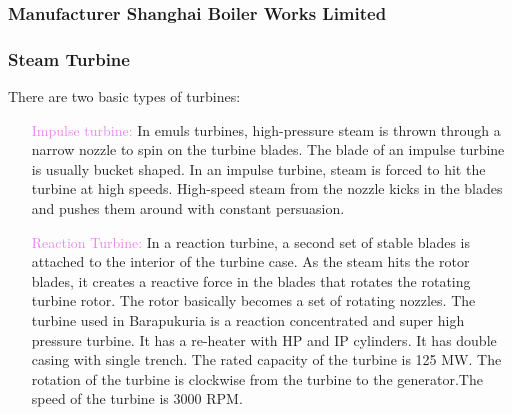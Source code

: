 \documentclass[11 pt]{article}
\begin{document}
\subsubsection{Manufacturer Shanghai Boiler Works Limited}

\subsubsection{Steam Turbine}

\pagebreak

There are two basic types of turbines:
\begin{enumerate}
	\item [\textcolor{violet}{Impulse turbine:}]In emuls turbines, high-pressure steam is thrown through a narrow nozzle to spin on the turbine blades. The blade of an impulse turbine is usually bucket shaped. In an impulse turbine, steam is forced to hit the turbine at high speeds. High-speed steam from the nozzle kicks in the blades and pushes them around with constant persuasion.
	\item [\textcolor{violet}{Reaction Turbine:}]In a reaction turbine, a second set of stable blades is attached to the interior of the turbine case. As the steam hits the rotor blades, it creates a reactive force in the blades that rotates the rotating turbine rotor. The rotor basically becomes a set of rotating nozzles. The turbine used in Barapukuria is a reaction concentrated and super high pressure turbine. It has a re-heater with HP and IP cylinders. It has double casing with single trench. The rated capacity of the turbine is 125 MW. The rotation of the turbine is clockwise from the turbine to the generator.The speed of the turbine is 3000 RPM.
\end{enumerate}
\end{document}
